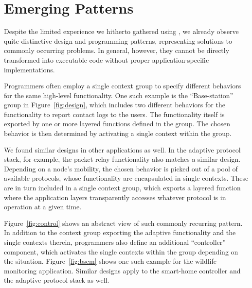 \section{Emerging Patterns}
\label{sec:patterns}

Despite the limited experience we hitherto gathered using \conesc, we
already observe quite distinctive design and programming patterns,
representing solutions to commonly occurring problems. In general,
however, they cannot be directly transformed into executable code
without proper application-specific implementations.


 Programmers often employ a single context
group to specify different behaviors for the same high-level
functionality. One such example is the ``Base-station'' group in
Figure~\ref{fig:design}, which includes two different behaviors for
the functionality to report contact logs to the users. The
functionality itself is exported by one or more layered functions
defined in the group. The chosen behavior is then determined by
activating a single context within the group.

We found similar designs in other applications as well. In the
adaptive protocol stack, for example, the packet relay functionality
also matches a similar design. Depending on a node's mobility, the
chosen behavior is picked out of a pool of available protocols, whose
functionality are encapsulated in single contexts. These are in turn
included in a single context group, which exports a layered function
where the application layers transparently accesses whatever protocol
is in operation at a given time.


Figure~\ref{fig:control} shows an abstract view of such commonly
recurring pattern. In addition to the context group exporting the
adaptive functionality and the single contexts therein, programmers
also define an additional ``controller'' component, which activates
the single contexts within the group depending on the
situation. Figure~\ref{fig:bscm} shows one such example for the
wildlife monitoring application. Similar designs apply to the
smart-home controller and the adaptive protocol stack as well.

